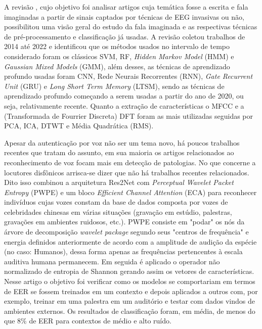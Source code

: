 			\par A revisão \cite{s23125575}, cujo objetivo foi analisar artigos cuja temática fosse a escrita e fala imaginadas a partir de sinais captados por técnicas de EEG invasivas ou não, possibilitou uma visão geral do estudo da fala imaginada e as respectivas técnicas de pré-processamento e classificação já usadas. A revisão coletou trabalhos de 2014 até 2022 e identificou que os métodos usados no intervalo de tempo considerado foram os clássicos SVM, RF, \textit{Hidden Markov Model} (HMM) e \textit{Gaussian Mixed Models} (GMM), além desses, as técnicas de aprendizado profundo usadas foram CNN, Rede Neurais Recorrentes (RNN), \textit{Gate Recurrent Unit} (GRU) e \textit{Long Short Term Memory} (LTSM), sendo as técnicas de aprendizado profundo começando a serem usadas a partir do ano de 2020, ou seja, relativamente recente. Quanto a extração de características o MFCC e a (Transformada de Fourrier Discreta) DFT foram as mais utilizadas seguidas por PCA, ICA, DTWT e Média Quadrática (RMS).
			
			\par Apesar da autenticação por voz não ser um tema novo, há poucos trabalhos recentes que tratam do assunto, em sua maioria os artigos relacionados ao reconhecimento de voz focam mais em detecção de patologias. No que concerne a locutores disfônicos arrisca-se dizer que não há trabalhos recentes relacionados. Dito isso \cite{math11194205} combinou a arquitetura Res2Net \cite{gao2019res2net} com \textit{Perceptual Wavelet Packet Entropy} (PWPE) e um bloco \textit{Efficient Channel Attention} (ECA) \cite{DBLP:journals/corr/abs-1910-03151} para reconhecer indivíduos cujas vozes constam da base de dados \cite{fan2020cn} composta por vozes de celebridades chinesas em várias situações (gravação em estúdio, palestras, gravações em ambientes ruidosos, etc.). PWPE consiste em "podar" os nós da árvore de decomposição \textit{wavelet package} segundo seus "centros de frequência" e energia definidos anteriormente de acordo com a amplitude de audição da espécie (no caso: Humanos), dessa forma apenas as frequências pertencentes à escala auditiva humana permanecem. Em seguida é aplicado o operador não normalizado de entropia de Shannon gerando assim os vetores de características. Nesse artigo o objetivo foi verificar como os modelos se comportariam em termos de EER se fossem treinados em um contexto e depois aplicados a outros com, por exemplo, treinar em uma palestra em um auditório e testar com dados vindos de ambientes externos. Os resultados de classificação foram, em média, de menos do que 8\% de EER para contextos de médio e alto ruído.
			
